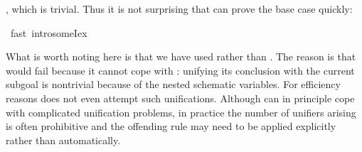 \begin{isabellebody}
\begin{isamarkuptxt}
, which is trivial. Thus it is not surprising that
 can prove the base case quickly:%
\end{isamarkuptxt}%
\ fast\ intro{\isacharcolon}someIex{\isacharparenright}%
\begin{isamarkuptxt}%
\noindent
What is worth noting here is that we have used  rather than .
The reason is that  would fail because it cannot cope with :
unifying its conclusion with the current subgoal is nontrivial because of the nested schematic
variables. For efficiency reasons  does not even attempt such unifications.
Although  can in principle cope with complicated unification problems, in practice
the number of unifiers arising is often prohibitive and the offending rule may need to be applied
explicitly rather than automatically.


\end{isamarkuptxt}
\end{isabellebody}

